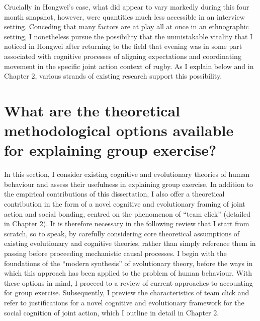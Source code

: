 Crucially in Hongwei's case, what did appear to vary markedly during this four month snapshot, however, were quantities much less accessible in an interview setting. Conceding that many factors are at play all at once in an ethnographic setting, I nonetheless pursue the possibility that the unmistakable vitality that I noticed in Hongwei after returning to the field that evening was in some part associated with cognitive processes of aligning expectations and coordinating movement in the specific joint action context of rugby.  As I explain below and in Chapter 2, various strands of existing research support this possibility.


\section{What are the theoretical methodological options available for explaining group exercise?}
In this section, I consider existing cognitive and evolutionary theories of human behaviour and assess their usefulness in explaining group exercise. In addition to the empirical contributions of this dissertation, I also offer a theoretical contribution in the form of a novel cognitive and evolutionary framing of joint action and social bonding, centred on the phenomenon of ``team click'' (detailed in Chapter 2). It is therefore necessary in the following review that I start from scratch, so to speak, by carefully considering core theoretical assumptions of existing evolutionary and cognitive theories, rather than simply reference them in passing before proceeding mechanistic causal processes.  I begin with the foundations of the ``modern synthesis'' of evolutionary theory, before the ways in which this approach has been applied to the problem of human behaviour.  With these options in mind, I proceed to a review of current approaches to accounting for group exercise.  Subsequently, I preview the characteristics of team click and refer to justifications for a novel cognitive and evolutionary framework for the social cognition of joint action, which I outline in detail in Chapter 2.

